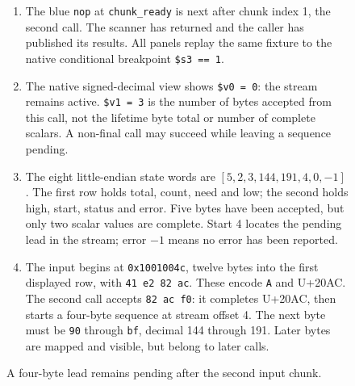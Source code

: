 \begin{figure}[htbp]
  \par\smallskip
  \begin{minipage}{\linewidth}
    \small
    \begin{enumerate}
      \setlength{\itemsep}{2pt}
            \setlength{\parsep}{0pt}
      \item The blue \texttt{nop} at \texttt{chunk\_ready} is next after chunk index 1, the second call. The scanner has returned and the caller has published its results. All panels replay the same fixture to the native conditional breakpoint \texttt{\$s3 == 1}.
      \item The native signed-decimal view shows \texttt{\$v0 = 0}: the stream remains active. \texttt{\$v1 = 3} is the number of bytes accepted from this call, not the lifetime byte total or number of complete scalars. A non-final call may succeed while leaving a sequence pending.
      \item The eight little-endian state words are $[5,2,3,144,191,4,0,-1]$. The first row holds total, count, need and low; the second holds high, start, status and error. Five bytes have been accepted, but only two scalar values are complete. Start 4 locates the pending lead in the stream; error $-1$ means no error has been reported.
      \item The input begins at \texttt{0x1001004c}, twelve bytes into the first displayed row, with \texttt{41 e2 82 ac}. These encode \texttt{A} and U+20AC. The second call accepts \texttt{82 ac f0}: it completes U+20AC, then starts a four-byte sequence at stream offset 4. The next byte must be \texttt{90} through \texttt{bf}, decimal 144 through 191. Later bytes are mapped and visible, but belong to later calls.
    \end{enumerate}
  \end{minipage}
  \caption{A four-byte lead remains pending after the second input chunk.}
  \label{capture:015-utf8-scanner-f01-pending}
  \label{utf8-f01-pending}
\end{figure}
\par
